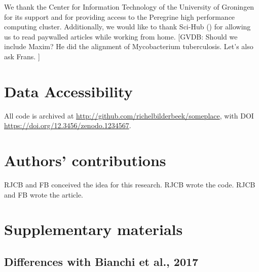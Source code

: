 We thank the Center for Information Technology of the University 
of Groningen for its support and for providing access to the Peregrine 
high performance computing cluster. 
Additionally, we would like to thank Sci-Hub (\cite{himmelstein2018sci})
for allowing us to read paywalled articles while working from home.
[GVDB: 
  Should we include Maxim? 
  He did the alignment of Mycobacterium tuberculosis. 
  Let’s also ask Frans.
]

\section{Data Accessibility}

All code is archived at \url{http://github.com/richelbilderbeek/someplace},
with DOI \url{https://doi.org/12.3456/zenodo.1234567}.

\section{Authors' contributions}

RJCB and FB conceived the idea for this research. 
RJCB wrote the code.
RJCB and FB wrote the article.





\appendix
\section{Supplementary materials}

\subsection{Differences with Bianchi et al., 2017}


